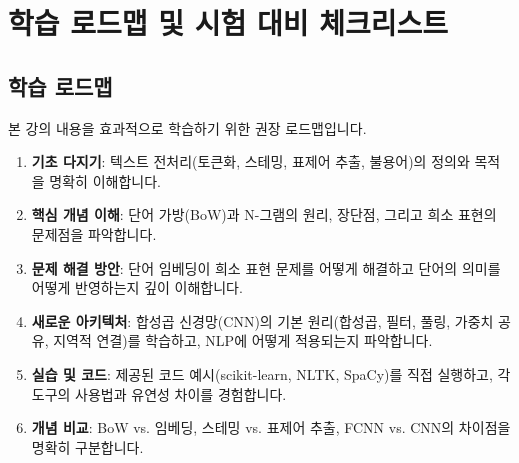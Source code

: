 \documentclass[11pt,a4paper]{article}
\begin{document}
\newpage
\section{학습 로드맵 및 시험 대비 체크리스트}

\subsection{학습 로드맵}
본 강의 내용을 효과적으로 학습하기 위한 권장 로드맵입니다.
\begin{enumerate}
    \item \textbf{기초 다지기}: 텍스트 전처리(토큰화, 스테밍, 표제어 추출, 불용어)의 정의와 목적을 명확히 이해합니다.
    \item \textbf{핵심 개념 이해}: 단어 가방(BoW)과 N-그램의 원리, 장단점, 그리고 희소 표현의 문제점을 파악합니다.
    \item \textbf{문제 해결 방안}: 단어 임베딩이 희소 표현 문제를 어떻게 해결하고 단어의 의미를 어떻게 반영하는지 깊이 이해합니다.
    \item \textbf{새로운 아키텍처}: 합성곱 신경망(CNN)의 기본 원리(합성곱, 필터, 풀링, 가중치 공유, 지역적 연결)를 학습하고, NLP에 어떻게 적용되는지 파악합니다.
    \item \textbf{실습 및 코드}: 제공된 코드 예시(scikit-learn, NLTK, SpaCy)를 직접 실행하고, 각 도구의 사용법과 유연성 차이를 경험합니다.
    \item \textbf{개념 비교}: BoW vs. 임베딩, 스테밍 vs. 표제어 추출, FCNN vs. CNN의 차이점을 명확히 구분합니다.
\end{enumerate}
\end{document}
